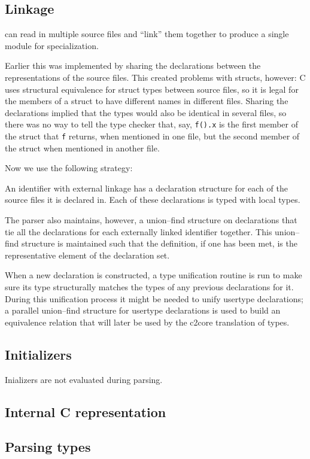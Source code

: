 \begin{docpart}
\subsection{Linkage}
\cmix can read in multiple source files and ``link'' them together
to produce a single module for specialization.

Earlier this was implemented by sharing the declarations
between the \ansiC representations of the source files. This created
problems with structs, however: C uses structural equivalence for
struct types between source files, so it is legal for the members of a
struct to have different names in different files. Sharing the
declarations implied that the types would also be identical in several
files, so there was no way to tell the type checker that, say,
\texttt{f().x} is the first member of the struct that \texttt{f}
returns, when mentioned in one file, but the second member of the
struct when mentioned in another file.

Now we use the following strategy:

An identifier with external linkage has a declaration structure for
each of the source files it is declared in. Each of these declarations
is typed with local types.

The parser also maintains, however, a union--find structure on
declarations that tie all the declarations for each externally linked
identifier together. This union--find structure is maintained such
that the definition, if one has been met, is the representative
element of the declaration set.

When a new declaration is constructed, a type unification routine is
run to make sure its type structurally matches the types of any
previous declarations for it. During this unification process it might
be needed to unify usertype declarations; a parallel union--find
structure for usertype declarations is used to build an equivalence
relation that will later be used by the c2core translation of types.

\subsection{Initializers}
Inializers are not evaluated during parsing.

\subsection{Internal C representation}

\subsection{Parsing types}


\end{docpart}
